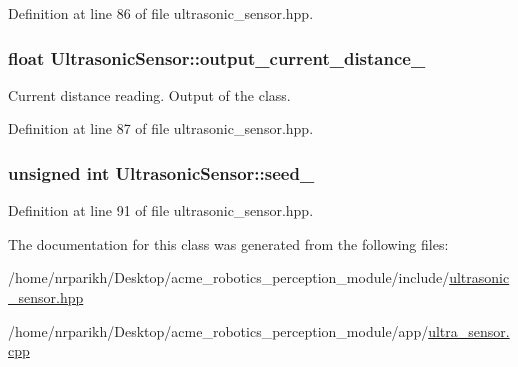 Definition at line 86 of file ultrasonic\+\_\+sensor.\+hpp.

\subsubsection[{\texorpdfstring{output\+\_\+current\+\_\+distance\+\_\+}{output_current_distance_}}]{\setlength{\rightskip}{0pt plus 5cm}float Ultrasonic\+Sensor\+::output\+\_\+current\+\_\+distance\+\_\+\hspace{0.3cm}{\ttfamily [private]}}\hypertarget{class_ultrasonic_sensor_a96a5d6ca72fcbe545ea88f504b24b44a}{}\label{class_ultrasonic_sensor_a96a5d6ca72fcbe545ea88f504b24b44a}
Current distance reading. Output of the class. 

Definition at line 87 of file ultrasonic\+\_\+sensor.\+hpp.

\subsubsection[{\texorpdfstring{seed\+\_\+}{seed_}}]{\setlength{\rightskip}{0pt plus 5cm}unsigned int Ultrasonic\+Sensor\+::seed\+\_\+\hspace{0.3cm}{\ttfamily [private]}}\hypertarget{class_ultrasonic_sensor_a3d7bb6ec05405169a0ea40432a79e318}{}\label{class_ultrasonic_sensor_a3d7bb6ec05405169a0ea40432a79e318}


Definition at line 91 of file ultrasonic\+\_\+sensor.\+hpp.



The documentation for this class was generated from the following files\+:\begin{DoxyCompactItemize}
\item 
/home/nrparikh/\+Desktop/acme\+\_\+robotics\+\_\+perception\+\_\+module/include/\hyperlink{ultrasonic__sensor_8hpp}{ultrasonic\+\_\+sensor.\+hpp}\item 
/home/nrparikh/\+Desktop/acme\+\_\+robotics\+\_\+perception\+\_\+module/app/\hyperlink{ultra__sensor_8cpp}{ultra\+\_\+sensor.\+cpp}\end{DoxyCompactItemize}
